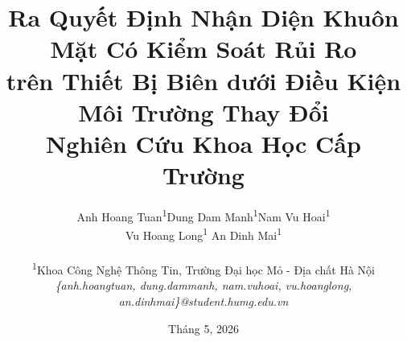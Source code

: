 \documentclass[12pt, a4paper]{article}
\title{
    \textbf{\Large Ra Quyết Định Nhận Diện Khuôn Mặt Có Kiểm Soát Rủi Ro}\\[0.5em]
    \textbf{\Large trên Thiết Bị Biên dưới Điều Kiện Môi Trường Thay Đổi}\\[1em]
    \large Nghiên Cứu Khoa Học Cấp Trường
}
\author{
    \begin{tabular}[t]{ccc}
    Anh Hoang Tuan\textsuperscript{1} & Dung Dam Manh\textsuperscript{1} & Nam Vu Hoai\textsuperscript{1} \\[1.5em]
    & Vu Hoang Long\textsuperscript{1} \quad\quad An Dinh Mai\textsuperscript{1} &
    \end{tabular}\\[5.0em]
    \textsuperscript{1}Khoa Công Nghệ Thông Tin, Trường Đại học Mỏ - Địa chất Hà Nội\\[0.3em]
    \small \textit{\{anh.hoangtuan, dung.dammanh, nam.vuhoai, vu.hoanglong, an.dinhmai\}@student.humg.edu.vn}
}
\date{Tháng 5, 2026}
\begin{document}
\maketitle
\thispagestyle{empty}

\begin{abstract}

\end{abstract}

\newpage
\tableofcontents
\newpage










\end{document}

